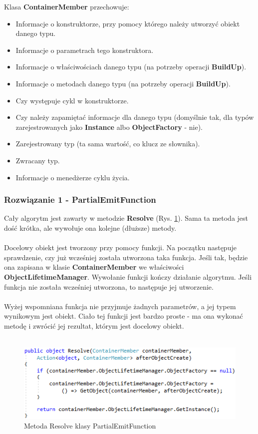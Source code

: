 \documentclass[12pt]{article}
\begin{document}
Klasa \textbf{ContainerMember} przechowuje:
\begin{itemize}
	\item Informacje o konstruktorze, przy pomocy którego należy utworzyć obiekt danego typu.
	\item Informacje o parametrach tego konstruktora.
	\item Informacje o właściwościach danego typu (na potrzeby operacji \textbf{BuildUp}).
	\item Informacje o metodach danego typu (na potrzeby operacji \textbf{BuildUp}).
	\item Czy występuje cykl w konstruktorze.
	\item Czy należy zapamiętać informacje dla danego typu (domyślnie tak, dla typów zarejestrowanych jako \textbf{Instance} albo \textbf{ObjectFactory} - nie).
	\item Zarejestrowany typ (ta sama wartość, co klucz ze słownika).
	\item Zwracany typ.
	\item Informacje o menedżerze cyklu życia.
\end{itemize}

\subsubsection{Rozwiązanie 1 - PartialEmitFunction}
Cały algorytm jest zawarty w metodzie \textbf{Resolve} (Rys. \ref{fig:PartialEmitFunction_Resolve}). Sama ta metoda jest dość krótka, ale wywołuje ona kolejne (dłuższe) metody.\\
\\
Docelowy obiekt jest tworzony przy pomocy funkcji. Na początku następuje sprawdzenie, czy już wcześniej została utworzona taka funkcja. Jeśli tak, będzie ona zapisana w klasie \textbf{ContainerMember} we właściwości \textbf{ObjectLifetimeManager}. Wywołanie funkcji kończy działanie algorytmu. Jeśli funkcja nie została wcześniej utworzona, to następuje jej utworzenie.\\
\\
Wyżej wspomniana funkcja nie przyjmuje żadnych parametrów, a jej typem wynikowym jest obiekt. Ciało tej funkcji jest bardzo proste - ma ona wykonać metodę i zwrócić jej rezultat, którym jest docelowy obiekt.\\ \\
\begin{figure}[H]
	\begin{center}
  		\includegraphics{PartialEmitFunction_Resolve.png}
  		\caption{Metoda Resolve klasy PartialEmitFunction}
  		\label{fig:PartialEmitFunction_Resolve}
	\end{center}
\end{figure}
\end{document}
